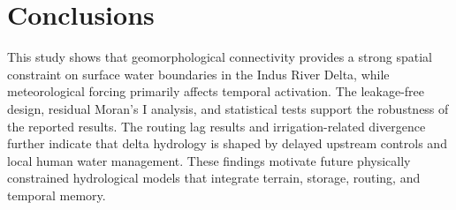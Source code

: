 \section{Conclusions}
This study shows that geomorphological connectivity provides a strong spatial constraint on surface water boundaries in the Indus River Delta, while meteorological forcing primarily affects temporal activation. The leakage-free design, residual Moran’s I analysis, and statistical tests support the robustness of the reported results. The routing lag results and irrigation-related divergence further indicate that delta hydrology is shaped by delayed upstream controls and local human water management. These findings motivate future physically constrained hydrological models that integrate terrain, storage, routing, and temporal memory.
